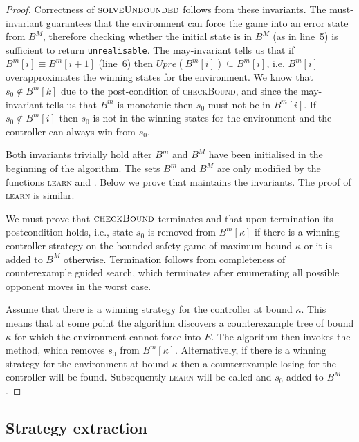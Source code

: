 \begin{theorem}

\end{theorem}
\begin{proof}
Correctness of $\textsc{solveUnbounded}$ follows from these invariants. The
must-invariant guarantees that the environment can force the game into an error
state from $B^M$, therefore checking whether the initial state is in $B^M$ (as
in line~5) is sufficient to return \texttt{unrealisable}. The may-invariant
tells us that if $B^m[i] \equiv B^m[i+1]$ (line~6) then $Upre(B^m[i]) \subseteq
B^m[i]$, i.e. $B^m[i]$ overapproximates the winning states for the environment.
We know that $s_0 \not\in B^m[k]$ due to the post-condition of
\textsc{checkBound}, and since the may-invariant tells us that $B^m$ is
monotonic then $s_0$ must not be in $B^m[i]$. If $s_0 \not\in B^m[i]$ then $s_0$ is not in the winning states for the environment and the controller can always win from $s_0$. 

Both invariants trivially hold after $B^m$ and $B^M$ have been initialised in
the beginning of the algorithm. The sets $B^m$ and $B^M$ are only modified by
the functions \textsc{learn} and .  Below we prove
that  maintains the invariants.  The proof of
\textsc{learn} is similar.

We must prove that $\textsc{checkBound}$ terminates and that upon termination
its postcondition holds, i.e., state $s_0$ is removed from $B^m[\kappa]$ if there
is a winning controller strategy on the bounded safety game of maximum bound
$\kappa$ or it is added to $B^M$ otherwise. Termination follows from
completeness of counterexample guided search, which terminates after
enumerating all possible opponent moves in the worst case.

Assume that there is a winning strategy for the controller at bound $\kappa$.
This means that at some point the algorithm discovers a counterexample tree of
bound $\kappa$ for which the environment cannot force into $E$. The algorithm
then invokes the \textsc{} method, which removes $s_0$ from
$B^m[\kappa]$.  Alternatively, if there is a winning strategy for the
environment at bound $\kappa$ then a counterexample losing for the controller
will be found.  Subsequently \textsc{learn} will be called and $s_0$ added to
$B^M$.

\end{proof}

\subsection{Strategy extraction}

